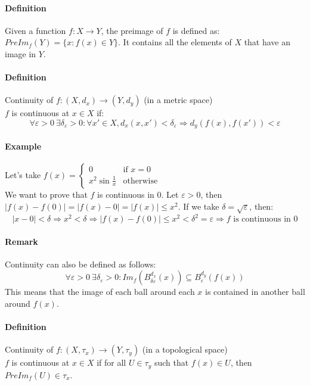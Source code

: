 \documentclass{article}
\newcommand{\DS}{\displaystyle}
\newcommand{\abs}[1]{\left|#1\right|}
\newcommand{\func}[3]{#1 : #2 \rightarrow #3}
\newcommand{\Ep}{\varepsilon}
\newcommand{\Def}{\paragraph{Definition}}
\newcommand{\Remark}{\paragraph{Remark}}
\newcommand{\Example}{\paragraph{Example}}
\begin{document}
	\Def Given a function $\func{f}{X}{Y}$, the preimage of $f$ is defined as:
	$PreIm_f(Y) = \{ x : f(x) \in Y \}$. It contains all the elements of $X$ that
	have an image in $Y$.

	\Def Continuity of $\func{f}{(X,d_x)}{(Y,d_y)}$ (in a metric space)
\\$f$ is continuous at $x \in X$ if:
	\begin{equation*}
		\forall \Ep > 0 \ \exists \delta_\Ep > 0 : \forall x' \in X,
		d_x(x,x') < \delta_\Ep \Rightarrow d_y(f(x),f(x')) < \Ep
	\end{equation*}

	\Example Let's take $\DS f(x) = \begin{cases} 0 & \text{if } x = 0 \\ x^2
	\sin\frac{1}{x} & \text{otherwise} \end{cases}$
\\We want to prove that $f$ is continuous in 0. Let $\Ep > 0$, then
	$\abs{f(x) - f(0)} = \abs{f(x) - 0} = \abs{f(x)} \leq x^2$. If we take $\delta
	= \sqrt{\Ep}$, then:
	\begin{equation*}
		\abs{x - 0} < \delta \Rightarrow x^2 < \delta \Rightarrow \abs{f(x) - f(0)}
		\leq x^2 < \delta^2 = \Ep \Rightarrow f \text{ is continuous in 0}
	\end{equation*}

	\Remark Continuity can also be defined as follows:
	\begin{equation*}
		\forall \Ep > 0 \ \exists \delta_\Ep > 0 :
		Im_f(B_{\delta\Ep}^{d_x}(x)) \subseteq B_\Ep^{d_y}(f(x))
	\end{equation*}
	This means that the image of each ball around each $x$ is contained in another
	ball around $f(x)$.

	\Def Continuity of $\func{f}{(X,\tau_x)}{(Y,\tau_y)}$ (in a topological space)
\\$f$ is continuous at $x \in X$ if for all $U \in \tau_y$ such that $f(x) \in
	U$, then $PreIm_f(U) \in \tau_x$.
\end{document}
